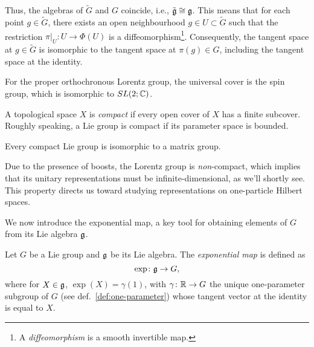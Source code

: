 Thus, the algebras of $\tilde{G}$ and $G$ coincide, i.e., $\tilde{\mathfrak{g}} \cong \mathfrak{g}$. This means that for each point $g \in \tilde{G}$, there exists an open neighbourhood $g \in U \subset \tilde{G}$ such that the restriction $\pi|_U \colon U \to \Phi(U)$ is a diffeomorphism\footnote{A \emph{diffeomorphism} is a smooth invertible map.}. Consequently, the tangent space at $g \in \tilde{G}$ is isomorphic to the tangent space at $\pi(g) \in G$, including the tangent space at the identity.

For the proper orthochronous Lorentz group, the universal cover is the spin group, which is isomorphic to $SL(2;\mathbb{C})$.

\begin{definition}\label{def:compact}
    A topological space $X$ is \emph{compact} if every open cover of $X$ has a finite subcover. Roughly speaking, a Lie group is compact if its parameter space is bounded.
\end{definition}

\begin{theorem}
    Every compact Lie group is isomorphic to a matrix group.
\end{theorem}

Due to the presence of boosts, the Lorentz group is \emph{non}-compact, which implies that its unitary representations must be infinite-dimensional, as we'll shortly see. This property directs us toward studying representations on one-particle Hilbert spaces.

We now introduce the exponential map, a key tool for obtaining elements of $G$ from its Lie algebra $\mathfrak{g}$.

\begin{definition}\label{def:exponential-map}
    Let $G$ be a Lie group and $\mathfrak{g}$ be its Lie algebra. The \emph{exponential map} is defined as
    \begin{equation}\label{eq:exp-map}
        \exp\colon \mathfrak{g} \to G ,
    \end{equation}
    where for $X \in \mathfrak{g}$, $\exp(X) = \gamma(1)$, with $\gamma\colon \mathbb{R} \to G$ the unique one-parameter subgroup of $G$ (see def.~\ref{def:one-parameter}) whose tangent vector at the identity is equal to $X$.
\end{definition}


